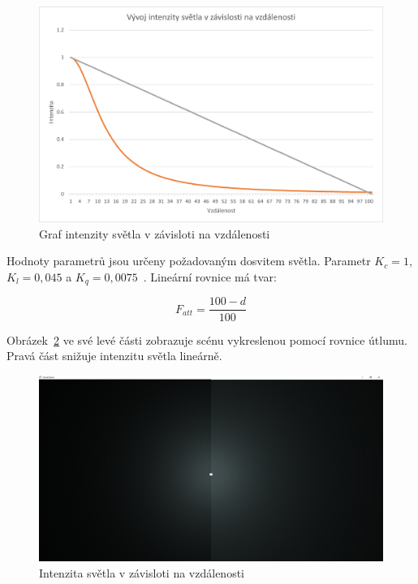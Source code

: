 \documentclass[thesis=M,czech]{FITthesis}[2019/12/23]
\begin{document}
\begin{figure}\centering
	\includegraphics[width=\textwidth]{images/lum}
	\caption[Graf intenzity světla v závisloti na vzdálenosti]{Graf intenzity světla v závisloti na vzdálenosti}\label{fig:lum}
\end{figure}

Hodnoty parametrů jsou určeny požadovaným dosvitem světla. Parametr $K_c = 1$, $K_l = 0,045$ a $K_q = 0,0075$~\cite{ogre_att}. Lineární rovnice má tvar:

$$ F_{att} = \frac{100 - d}{100} $$

Obrázek~\ref{fig:light} ve své levé části zobrazuje scénu vykreslenou pomocí rovnice útlumu. Pravá část snižuje intenzitu světla lineárně.

\begin{figure}\centering
	\includegraphics[width=\textwidth]{images/light}
	\caption[Intenzita světla v závisloti na vzdálenosti]{Intenzita světla v závisloti na vzdálenosti}\label{fig:light}
\end{figure}

\end{document}
